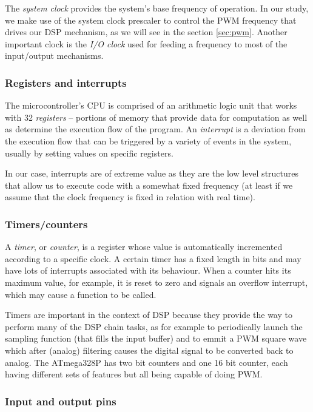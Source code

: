 The \emph{system clock} provides the system's base frequency of operation. In
our study, we make use of the system clock prescaler to control the PWM
frequency that drives our DSP mechanism, as we will see in the section
\ref{sec:pwm}. Another important clock is the \emph{I/O clock} used for
feeding a frequency to most of the input/output mechanisms.

\subsubsection{Registers and interrupts}

The microcontroller's CPU is comprised of an arithmetic logic unit that works
with 32 \emph{registers} -- portions of memory that provide data for
computation as well as determine the execution flow of the program. An
\emph{interrupt} is a deviation from the execution flow that can be triggered
by a variety of events in the system, usually by setting values on specific
registers.

In our case, interrupts are of extreme value as they are the low level
structures that allow us to execute code with a somewhat fixed frequency (at
least if we assume that the clock frequency is fixed in relation with real
time).

\subsubsection{Timers/counters}

A \emph{timer}, or \emph{counter}, is a register whose value is automatically
incremented according to a specific clock. A certain timer has a fixed length
in bits and may have lots of interrupts associated with its behaviour. When a
counter hits its maximum value, for example, it is reset to zero and signals
an overflow interrupt, which may cause a function to be called.

Timers are important in the context of DSP because they provide the way to
perform many of the DSP chain tasks, as for example to periodically launch the
sampling function (that fills the input buffer) and to emmit a PWM square wave
which after (analog) filtering causes the digital signal to be converted back
to analog. The ATmega328P has two bit counters and one 16 bit counter, each
having different sets of features but all being capable of doing PWM.

\subsubsection{Input and output pins}


